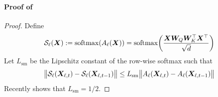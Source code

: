 \paragraph{Proof of }
\begin{proof}
Define
$$\mathcal S_\ell({\bm{X}}):=\mathrm{softmax}(A_\ell({\bm{X}})) = \mathrm{softmax}{\left ( \frac{{\bm{X}} {\bm{W}}_Q {\bm{W}}_K^{\top} {\bm{X}}^{\top}}{\sqrt{d}} \right )}$$
Let $L_{\mathrm{sm}}$ be the Lipschitz constant of the row-wise softmax such that
    \begin{equation}\label{eq:softmax_lip}
        \big\|\mathcal S_\ell({\bm{X}}_{\ell,t})-\mathcal S_\ell({\bm{X}}_{\ell,t-1})\big\| \leq L_{\mathrm{sm}} \big\| A_\ell({\bm{X}}_{\ell,t})- A_\ell({\bm{X}}_{\ell,t-1})\big\|
    \end{equation}
    Recently \citet{nair2025softmax} shows that $L_{\mathrm{sm}} = 1/2$.


\end{proof}

